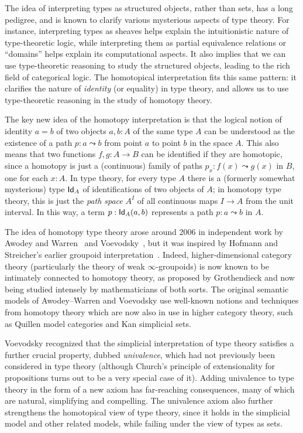 The idea of interpreting types as structured objects, rather than sets, has a long pedigree, and is known to clarify various mysterious aspects of type theory.
For instance, interpreting types as sheaves helps explain the intuitionistic nature of type-theoretic logic, while interpreting them as partial equivalence relations or ``domains'' helps explain its computational aspects.
It also implies that we can use type-theoretic reasoning to study the structured objects, leading to the rich field of categorical logic.
The homotopical interpretation fits this same pattern: it clarifies the nature of \emph{identity} (or equality) in type theory, and allows us to use type-theoretic reasoning in the study of homotopy theory.

The key new idea of the homotopy interpretation is that the logical notion of identity $a = b$ of two objects $a, b: A$ of the same type $A$ can be understood as the existence of a path $p : a \leadsto b$ from point $a$ to point $b$ in the space $A$.
This also means that two functions $f, g: A\to B$ can be identified if they are homotopic, since a homotopy is just a (continuous) family of paths $p_x: f(x) \leadsto g(x)$ in $B$, one for each $x:A$.
In type theory, for every type $A$ there is a (formerly somewhat mysterious) type $\idtypevar{A}$ of identifications of two objects of $A$; in homotopy type theory, this is just the \emph{path space} $A^I$ of all continuous maps $I\to A$ from the unit interval.
In this way, a term $p : \idtype[A]{a}{b}$ represents a path $p : a \leadsto b$ in $A$. 

The idea of homotopy type theory arose around 2006 in independent work by Awodey and Warren~\citep{AW} and Voevodsky~\citep{VV}, but it was inspired by 
Hofmann and Streicher's earlier groupoid interpretation~\citep{hs:gpd-typethy}.
Indeed, higher-dimensional category theory (particularly the theory of weak $\infty$-groupoids) is now known to be intimately connected to homotopy theory, as proposed by Grothendieck and now being studied intensely by mathematicians of both sorts.
The original semantic models of Awodey--Warren and Voevodsky use well-known notions and techniques from homotopy theory which are now also in use in higher category theory, such as  Quillen model categories and Kan simplicial sets.

Voevodsky recognized that the simplicial interpretation of type theory satisfies a further crucial property, dubbed \emph{univalence}, which had not previously been considered in type theory (although Church's principle of extensionality for propositions turns out to be a very special case of it).
Adding univalence to type theory in the form of a new axiom has far-reaching consequences, many of which are natural, simplifying and compelling.
The univalence axiom also further strengthens the homotopical view of type theory, since it holds in the simplicial model and other related models, while failing under the view of types as sets.


